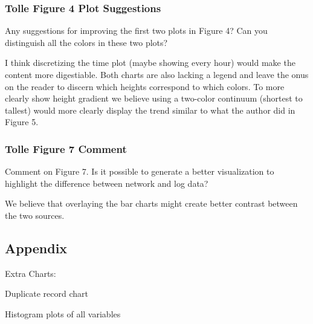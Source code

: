 \documentclass[
  twocolumn]{article}
\begin{document}
\hypertarget{tolle-figure-4-plot-suggestions}{%
\subsubsection{Tolle Figure 4 Plot
Suggestions}\label{tolle-figure-4-plot-suggestions}}

Any suggestions for improving the first two plots in Figure 4? Can you
distinguish all the colors in these two plots?

I think discretizing the time plot (maybe showing every hour) would make
the content more digestiable. Both charts are also lacking a legend and
leave the onus on the reader to discern which heights correspond to
which colors. To more clearly show height gradient we believe using a
two-color continuum (shortest to tallest) would more clearly display the
trend similar to what the author did in Figure 5.

\hypertarget{tolle-figure-7-comment}{%
\subsubsection{Tolle Figure 7 Comment}\label{tolle-figure-7-comment}}

Comment on Figure 7. Is it possible to generate a better visualization
to highlight the difference between network and log data?

We believe that overlaying the bar charts might create better contrast
between the two sources.

\hypertarget{appendix}{%
\subsection{Appendix}\label{appendix}}

Extra Charts:

Duplicate record chart

Histogram plots of all variables
\end{document}
